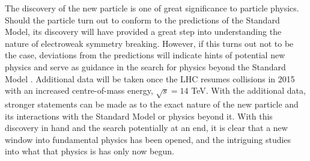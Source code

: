 The discovery of the new particle is one of great significance to particle physics.
Should the particle turn out to conform to the predictions of the Standard Model, 
its discovery will have provided a great step into understanding the nature of 
electroweak symmetry breaking. However, if this turns out not to be the case, 
deviations from the predictions will indicate hints of potential new physics
and serve as guidance in the search for physics beyond the Standard Model . 
Additional data will be taken once the LHC resumes 
collisions in 2015 with an increased centre-of-mass energy, $\sqrt{s}=14$ TeV. 
With the additional data, stronger statements can be made as to 
the exact nature of the new particle and its interactions with the Standard Model or physics beyond it. With this discovery in hand and the search potentially at an end, 
it is clear that a new window into fundamental physics has been opened, and the intriguing 
studies into what that physics is has only now begun.




